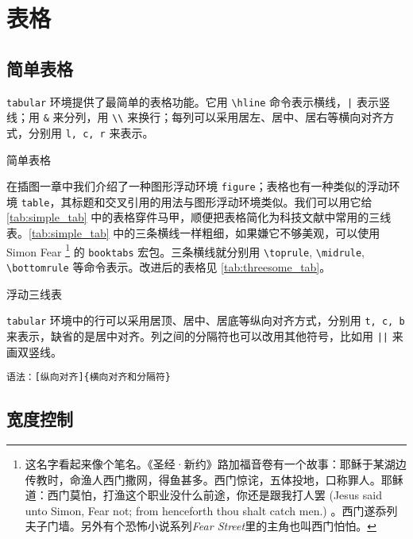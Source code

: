 \chapter{表格}

\section{简单表格}

\texttt{tabular} 环境提供了最简单的表格功能。它用 \verb|\hline| 命令表示横线，\verb+|+ 表示竖线；用 \verb|&| 来分列，用 \verb|\\| 来换行；每列可以采用居左、居中、居右等横向对齐方式，分别用 \texttt{l, c, r} 来表示。

\begin{example}[htbp]
\caption{简单表格}
\label{tab:simple_tab}
\end{example}


在插图一章中我们介绍了一种图形浮动环境 \texttt{figure}；表格也有一种类似的浮动环境 \texttt{table}，其标题和交叉引用的用法与图形浮动环境类似。我们可以用它给 \autoref{tab:simple_tab} 中的表格穿件马甲，顺便把表格简化为科技文献中常用的三线表。\autoref{tab:simple_tab} 中的三条横线一样粗细，如果嫌它不够美观，可以使用 Simon Fear\indexFear{} \footnote{这名字看起来像个笔名。《圣经·新约》路加福音卷有一个故事：耶稣于某湖边传教时，命渔人西门撒网，得鱼甚多。西门惊诧，五体投地，口称罪人。耶稣道：西门莫怕，打渔这个职业没什么前途，你还是跟我打人罢 (Jesus said unto Simon, Fear not; from henceforth thou shalt catch men.) 。西门遂忝列夫子门墙。另外有个恐怖小说系列\emph{Fear Street}里的主角也叫西门怕怕。} 的 \texttt{booktabs} 宏包\citep{Fear_booktabs}。三条横线就分别用 \verb|\toprule|, \verb|\midrule|, \verb|\bottomrule| 等命令表示。改进后的表格见 \autoref{tab:threesome_tab}。

\begin{example}[htbp]
\caption{浮动三线表}
\label{tab:threesome_tab}
\end{example}

\texttt{tabular} 环境中的行可以采用居顶、居中、居底等纵向对齐方式，分别用 \texttt{t, c, b} 来表示，缺省的是居中对齐。列之间的分隔符也可以改用其他符号，比如用 \verb+||+ 来画双竖线。

\verb|语法：[纵向对齐]{横向对齐和分隔符}|

\section{宽度控制}

